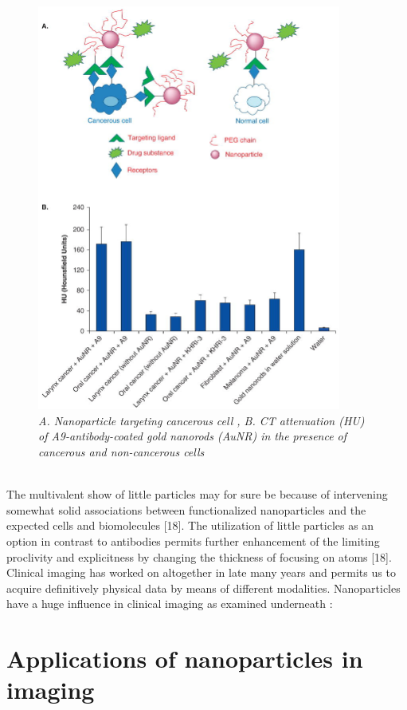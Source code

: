 \documentclass[12pt]{article}
\begin{document}
\begin{figure}[htp]
    \centering
    \includegraphics[width=10cm]{1.jpg}
    \caption{\textit{A. Nanoparticle targeting cancerous cell ,  B. CT attenuation (HU) of A9-antibody-coated gold nanorods (AuNR) in the presence of cancerous and non-cancerous cells}}
    \label{Fig:2}
\end{figure}
\\
The multivalent show of little particles may for sure be because of intervening somewhat solid associations between functionalized nanoparticles and the expected cells and biomolecules [18]. The utilization of little particles as an option in contrast to antibodies permits further enhancement of the limiting proclivity and explicitness by changing the thickness of focusing on atoms [18]. Clinical imaging has worked on altogether in late many years and permits us to acquire definitively physical data by means of different modalities. Nanoparticles have a huge influence in clinical imaging as examined underneath :

\section*{Applications of nanoparticles in imaging }
\end{document}
